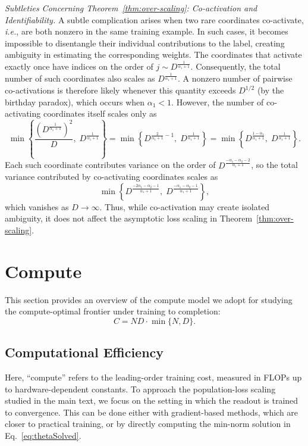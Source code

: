 \documentclass[11pt]{article}
\theoremstyle{plain}
\theoremstyle{definition}
\theoremstyle{remark}
\newcommand{\JSCheck}[1]{#1}
\begin{document}
\noindent\emph{Subtleties Concerning Theorem~\ref{thm:over-scaling}: Co-activation and Identifiability.} A subtle complication arises when two rare coordinates co-activate, \textit{i.e.}, are both nonzero in the same training example. In such cases, it becomes impossible to disentangle their individual contributions to the label, creating ambiguity in estimating the corresponding weights. The coordinates that activate exactly once have indices on the order of
$j \sim D^{\frac{1}{\alpha_1 + 1}}$. Consequently, the total number of such
coordinates also scales as $D^{\frac{1}{\alpha_1 + 1}}$. A nonzero number of
pairwise co-activations is therefore likely whenever this quantity exceeds
$D^{1/2}$ (by the birthday paradox), which occurs when $\alpha_1 < 1$.
However, the number of co-activating coordinates itself scales only as
\[
\min\left\{ \frac{\left(D^{\frac{1}{\alpha_1 + 1}}\right)^2}{D},\;
D^{\frac{1}{\alpha_1 + 1}} \right\}
= \min\left\{ D^{\frac{2}{\alpha_1 + 1} - 1},\;
D^{\frac{1}{\alpha_1 + 1}} \right\}
= \min\left\{ D^{\frac{1 - \alpha_1}{\alpha_1 + 1}},\;
D^{\frac{1}{\alpha_1 + 1}} \right\}.
\]
Each such coordinate contributes variance on the order of
$D^{\frac{-\alpha_1 - \alpha_2 - 2}{\alpha_1 + 1}}$, so the total variance
contributed by co-activating coordinates scales as
\[
\min\left\{
D^{\frac{-2\alpha_1 - \alpha_2 - 1}{\alpha_1 + 1}},\;
D^{\frac{-\alpha_1 - \alpha_2 - 1}{\alpha_1 + 1}}
\right\},
\]
which vanishes as $D \to \infty$. Thus, while co-activation may create isolated ambiguity, it does not affect the asymptotic loss scaling in Theorem~\ref{thm:over-scaling}.




\section{\JSCheck{Compute}}\label{appendix:compute}


This section provides an overview of the compute model we adopt for studying the compute-optimal frontier under training to completion:
\begin{equation}
    C = ND \cdot \min\{N,D\}.
\end{equation}



\subsection{Computational Efficiency}

Here, ``compute'' refers to the leading-order training cost, measured in FLOPs up to hardware-dependent constants. To approach the population-loss scaling studied in the main text, we focus on the setting in which the readout is trained to convergence. This can be done either with gradient-based methods, which are closer to practical training, or by directly computing the min-norm solution in Eq.~\eqref{eq:thetaSolved}.
\end{document}
